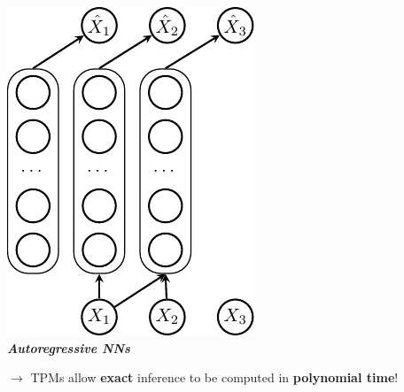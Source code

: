 \documentclass[xcolor={usenames,dvipsnames,svgnames}, compress]{beamer}
\newcommand{\cmark}{\ding{51}}%
\newcommand{\xmark}{\ding{55}}
\begin{document}
\begin{frame}[t]
\begin{center}
\begin{minipage}[t]{0.29\linewidth}
\begin{center}
        \includegraphics[width=0.8\linewidth]{figures/nade}\\
        \textbf{\emph{\textcolor{tractable_green}{Autoregressive NNs}}}\\[20pt]
      \end{center}
    \end{minipage}
  \end{center}\vspace{7pt}
  $\rightarrow$ TPMs allow \textbf{exact} inference to be computed in \textbf{\textcolor{tractable_green}{polynomial time}}!
\end{frame}
\end{document}
